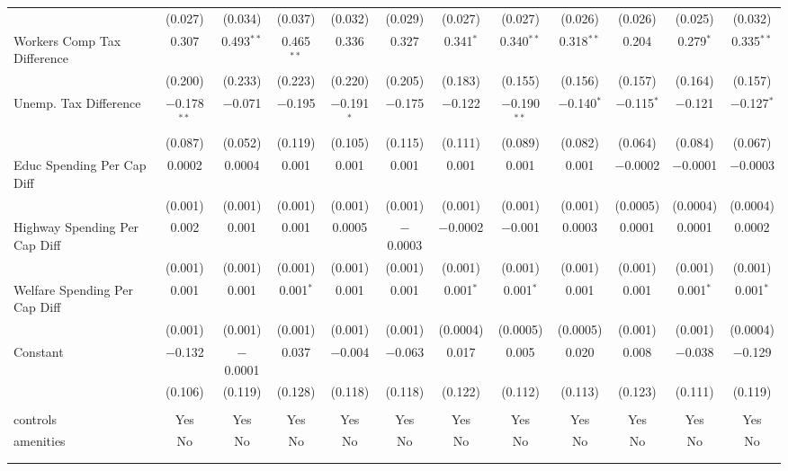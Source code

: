 \begin{table}[!htbp]
\begin{tabular}{@{\extracolsep{5pt}}lccccccccccc}
  & (0.027) & (0.034) & (0.037) & (0.032) & (0.029) & (0.027) & (0.027) & (0.026) & (0.026) & (0.025) & (0.032) \\ 
  Workers Comp Tax Difference & 0.307 & 0.493$^{**}$ & 0.465$^{**}$ & 0.336 & 0.327 & 0.341$^{*}$ & 0.340$^{**}$ & 0.318$^{**}$ & 0.204 & 0.279$^{*}$ & 0.335$^{**}$ \\ 
  & (0.200) & (0.233) & (0.223) & (0.220) & (0.205) & (0.183) & (0.155) & (0.156) & (0.157) & (0.164) & (0.157) \\ 
  Unemp. Tax Difference & $-$0.178$^{**}$ & $-$0.071 & $-$0.195 & $-$0.191$^{*}$ & $-$0.175 & $-$0.122 & $-$0.190$^{**}$ & $-$0.140$^{*}$ & $-$0.115$^{*}$ & $-$0.121 & $-$0.127$^{*}$ \\ 
  & (0.087) & (0.052) & (0.119) & (0.105) & (0.115) & (0.111) & (0.089) & (0.082) & (0.064) & (0.084) & (0.067) \\ 
  Educ Spending Per Cap Diff & 0.0002 & 0.0004 & 0.001 & 0.001 & 0.001 & 0.001 & 0.001 & 0.001 & $-$0.0002 & $-$0.0001 & $-$0.0003 \\ 
  & (0.001) & (0.001) & (0.001) & (0.001) & (0.001) & (0.001) & (0.001) & (0.001) & (0.0005) & (0.0004) & (0.0004) \\ 
  Highway Spending Per Cap Diff & 0.002 & 0.001 & 0.001 & 0.0005 & $-$0.0003 & $-$0.0002 & $-$0.001 & 0.0003 & 0.0001 & 0.0001 & 0.0002 \\ 
  & (0.001) & (0.001) & (0.001) & (0.001) & (0.001) & (0.001) & (0.001) & (0.001) & (0.001) & (0.001) & (0.001) \\ 
  Welfare Spending Per Cap Diff & 0.001 & 0.001 & 0.001$^{*}$ & 0.001 & 0.001 & 0.001$^{*}$ & 0.001$^{*}$ & 0.001 & 0.001 & 0.001$^{*}$ & 0.001$^{*}$ \\ 
  & (0.001) & (0.001) & (0.001) & (0.001) & (0.001) & (0.0004) & (0.0005) & (0.0005) & (0.001) & (0.001) & (0.0004) \\ 
  Constant & $-$0.132 & $-$0.0001 & 0.037 & $-$0.004 & $-$0.063 & 0.017 & 0.005 & 0.020 & 0.008 & $-$0.038 & $-$0.129 \\ 
  & (0.106) & (0.119) & (0.128) & (0.118) & (0.118) & (0.122) & (0.112) & (0.113) & (0.123) & (0.111) & (0.119) \\ 
 \hline \\[-1.8ex] 
controls & Yes & Yes & Yes & Yes & Yes & Yes & Yes & Yes & Yes & Yes & Yes \\ 
amenities & No & No & No & No & No & No & No & No & No & No & No \\ 
\hline \\[-1.8ex] 
\hline 
\hline \\[-1.8ex] 
\end{tabular} 
\end{table} 
